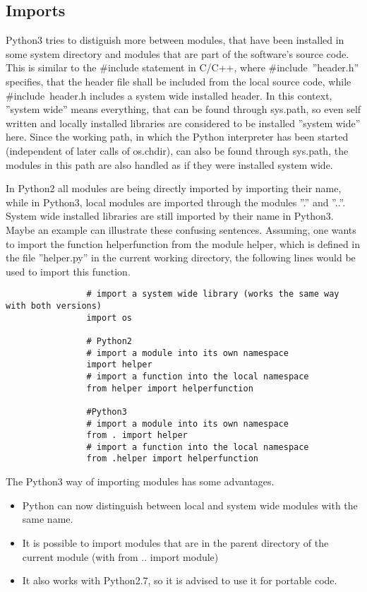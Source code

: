 		\subsection{Imports}
			\label{Imports}
			Python3 tries to distiguish more between modules, that have been installed in some system directory and modules that are part of the software's source code.
			This is similar to the {\normalfont \ttfamily \#include} statement in C/C++, where {\normalfont \ttfamily \#include~''header.h''} specifies, that the header file shall be included from the local source code, while {\normalfont \ttfamily \#include~\textlangle header.h\textrangle} includes a system wide installed header.
			In this context, ''system wide'' means everything, that can be found through {\normalfont \ttfamily sys.path}, so even self written and locally installed libraries are considered to be installed ''system wide'' here.
			Since the working path, in which the Python interpreter has been started (independent of later calls of {\normalfont \ttfamily os.chdir}), can also be found through {\normalfont \ttfamily sys.path}, the modules in this path are also handled as if they were installed system wide.

			In Python2 all modules are being directly imported by importing their name, while in Python3, local modules are imported through the modules ''.'' and ''..''.
			System wide installed libraries are still imported by their name in Python3.\\
			Maybe an example can illustrate these confusing sentences.
			Assuming, one wants to import the function {\normalfont \ttfamily helperfunction} from the module {\normalfont \ttfamily helper}, which is defined in the file ''helper.py'' in the current working directory, the following lines would be used to import this function.
			\begin{verbatim}
				# import a system wide library (works the same way with both versions)
				import os

				# Python2
				# import a module into its own namespace
				import helper
				# import a function into the local namespace
				from helper import helperfunction

				#Python3
				# import a module into its own namespace
				from . import helper
				# import a function into the local namespace
				from .helper import helperfunction
			\end{verbatim}

			The Python3 way of importing modules has some advantages.
			\begin{itemize}
				\item Python can now distinguish between local and system wide modules with the same name.
				\item It is possible to import modules that are in the parent directory of the current module (with {\normalfont \ttfamily from .. import module})
				\item It also works with Python2.7, so it is advised to use it for portable code.
			\end{itemize}

